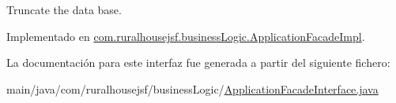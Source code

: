 Truncate the data base. 



Implementado en \mbox{\hyperlink{a00132_a5fe9f44c95b3459fb8999c26e5b934cb}{com.\+ruralhousejsf.\+business\+Logic.\+Application\+Facade\+Impl}}.



La documentación para este interfaz fue generada a partir del siguiente fichero\+:\begin{DoxyCompactItemize}
\item 
main/java/com/ruralhousejsf/business\+Logic/\mbox{\hyperlink{a00008}{Application\+Facade\+Interface.\+java}}\end{DoxyCompactItemize}
